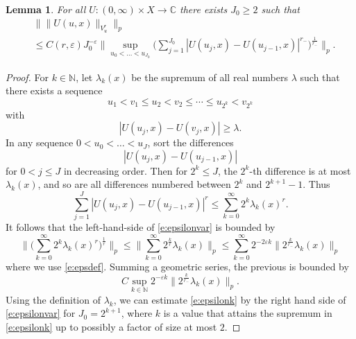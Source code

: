 \documentclass[12pt,reqno,a4paper,dvipsnames]{amsart}
\theoremstyle{plain}
\newtheorem{lemma}[theorem]{Lemma}
\theoremstyle{definition}
\numberwithin{theorem}{section}
\numberwithin{equation}{section}
\newcommand{\N}{\mathbb{N}}
\begin{document}
\begin{lemma}
    For all $U: (0, \infty) \times X \to \mathbb{C}$ there exists $J_0 \ge 2$ such that
    \begin{align}\label{e:epsilonvar}
        &\big\|\|U(u,x)\|_{V^r_u}\big\|_{p}\nonumber\\
        &\le C(r,\varepsilon) J_0^{-\varepsilon} \Big\|\sup_{u_0<\dots <u_{J_0}} \Big(\sum_{j=1}^{J_0} |U(u_j, x)-U(u_{j-1},x)|^{r_-}\Big)^{\frac{1}{r_-}}\Big\|_p.
    \end{align}
\end{lemma}
\begin{proof}
For $k\in \N$, let $\lambda_k(x)$ be the supremum of all real numbers $\lambda$ such that there exists a sequence
\[u_1 < v_1 \leq u_2 < v_2 \leq \dotsb \leq u_{2^k} < v_{2^k}\]
with 
$$|U(u_j,x) - U(v_j,x)| \geq \lambda.$$ 
In any sequence $0<u_0<\dots<u_J$,
sort the differences $$ |U(u_j,x)-U(u_{j-1}, x)|$$ for $0<j\le J$
in decreasing order. Then for $2^k\le J$, 
the $2^k$-th difference is  at most $\lambda_k(x)$,
and so are all differences numbered between $2^k$ and $2^{k+1}-1$.
Thus
\begin{equation}\label{e:sortsum}
\sum_{j=1}^J|U(u_j,x)-U(u_{j-1}, x)|^{{r}}
\le \sum_{k=0}^\infty 2^k \lambda_k(x)^r. 
\end{equation}
It follows that the left-hand-side of \eqref{e:epsilonvar}
is bounded by
\[
    \Big\|\Big(\sum_{k=0}^\infty 2^k \lambda_k(x)^r\Big)^{\frac{1}{r}}\Big\|_p \le \Big\|\sum_{k=0}^\infty 2^{\frac{k}{r}}
    \lambda_k(x)\Big\|_p \le \sum_{k=0}^\infty 2^{-2\varepsilon k} \Big\| 2^{\frac{k}{r_-}}\lambda_k(x)\Big\|_p 
\]
where we use \eqref{e:epsdef}. Summing a geometric series, the previous is bounded by
\begin{equation}
    \label{e:epsilonk}
    C \sup_{k\in \N} 2^{-\varepsilon k} \Big\|  2^{\frac{k}{r_-}}\lambda_k(x)\Big\|_p . 
\end{equation}
Using the definition of $\lambda_k$, we can estimate \eqref{e:epsilonk}
by the right hand side of \eqref{e:epsilonvar} for $J_0=2^{k+1}$, where $k$ is a value that
attains the supremum in \eqref{e:epsilonk} up to possibly a factor of size 
at most $2$. 
\end{proof}
\end{document}
